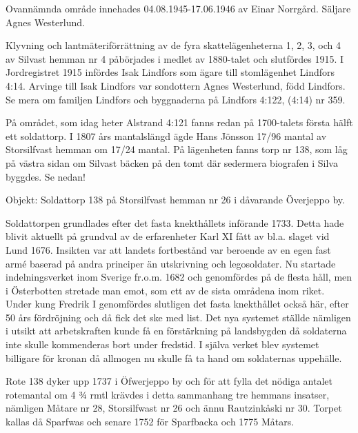 Ovannämnda område innehades 04.08.1945-17.06.1946	av Einar Norrgård. Säljare Agnes Westerlund.\jhvspace{}


Klyvning och lantmäteriförrättning av de fyra skattelägenheterna 1, 2, 3, och 4 av Silvast hemman nr 4 påbörjades i medlet av 1880-talet och slutfördes 1915. I Jordregistret 1915 infördes Isak Lindfors som ägare till stomlägenhet Lindfors 4:14. Arvinge till Isak Lindfors var	sondottern Agnes Westerlund, född Lindfors. Se mera om familjen Lindfors och byggnaderna på Lindfors 4:122, (4:14) nr 359.


På området, som idag heter Alstrand 4:121 fanns redan på 1700-talets första hälft ett soldattorp. I 1807 års mantalslängd	ägde Hans Jönsson 17/96 mantal av Storsilfvast hemman om 17/24 mantal. På lägenheten fanns torp nr 138, som	låg på västra sidan om Silvast bäcken på den tomt där sedermera biografen i Silva byggdes. Se nedan!




\jhnooccupant{}

Objekt: Soldattorp 138 på Storsilfvast hemman nr 26 i dåvarande Överjeppo by.

Soldattorpen grundlades efter det fasta knekthållets införande 1733. Detta hade blivit aktuellt på grundval av de erfarenheter Karl XI fått av bl.a. slaget vid Lund 1676. Insikten var att landets fortbestånd var beroende av en egen fast armé baserad på andra principer än utskrivning och legosoldater. Nu startade indelningsverket inom Sverige fr.o.m. 1682 och genomfördes på de flesta håll, men i Österbotten stretade man emot, som ett av de sista områdena inom riket. Under kung Fredrik I genomfördes slutligen det fasta knekthållet också här, efter 50 års fördröjning och då  fick det ske med list. Det nya systemet ställde nämligen i utsikt att arbetskraften kunde få en förstärkning på landsbygden då soldaterna inte skulle kommenderas bort under fredstid. I själva verket blev systemet billigare för kronan då allmogen nu skulle få ta hand om soldaternas uppehälle.

Rote 138 dyker upp 1737 i Öfwerjeppo by och för att fylla det nödiga antalet rotemantal om 4 ¾ rmtl krävdes i detta sammanhang tre hemmans insatser, nämligen Måtare nr 28, Storsilfwast nr 26 och ännu Rautzinkåski nr 30. Torpet kallas då Sparfwas och senare 1752 för Sparfbacka och 1775 Måtars.

